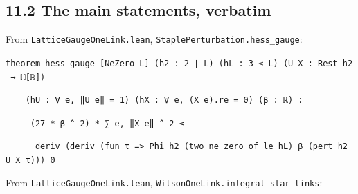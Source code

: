 \documentclass[11pt,a4paper]{article}
\theoremstyle{named}
\begin{document}
\subsection*{11.2 The main statements, verbatim}
From \texttt{LatticeGaugeOneLink.\allowbreak{}lean}, \texttt{StaplePerturbation.\allowbreak{}hess\_\allowbreak{}gauge}:

\begin{leancode}
\item \texttt{theorem\ \allowbreak{}hess\_\allowbreak{}gauge\ \allowbreak{}[NeZero\ \allowbreak{}L]\ \allowbreak{}(h2\ \allowbreak{}:\ \allowbreak{}2\ \allowbreak{}∣\ \allowbreak{}L)\ \allowbreak{}(hL\ \allowbreak{}:\ \allowbreak{}3\ \allowbreak{}≤\ \allowbreak{}L)\ \allowbreak{}(U\ \allowbreak{}X\ \allowbreak{}:\ \allowbreak{}Rest\ \allowbreak{}h2\ \allowbreak{}→\ \allowbreak{}ℍ[ℝ])}
\item \texttt{\ \allowbreak{}\ \allowbreak{}\ \allowbreak{}\ \allowbreak{}(hU\ \allowbreak{}:\ \allowbreak{}∀\ \allowbreak{}e,\ \allowbreak{}‖U\ \allowbreak{}e‖\ \allowbreak{}=\ \allowbreak{}1)\ \allowbreak{}(hX\ \allowbreak{}:\ \allowbreak{}∀\ \allowbreak{}e,\ \allowbreak{}(X\ \allowbreak{}e).\allowbreak{}re\ \allowbreak{}=\ \allowbreak{}0)\ \allowbreak{}(β\ \allowbreak{}:\ \allowbreak{}ℝ)\ \allowbreak{}:}
\item \texttt{\ \allowbreak{}\ \allowbreak{}\ \allowbreak{}\ \allowbreak{}-(27\ \allowbreak{}*\ \allowbreak{}β\ \allowbreak{}\textasciicircum{}\ \allowbreak{}2)\ \allowbreak{}*\ \allowbreak{}∑\ \allowbreak{}e,\ \allowbreak{}‖X\ \allowbreak{}e‖\ \allowbreak{}\textasciicircum{}\ \allowbreak{}2\ \allowbreak{}≤}
\item \texttt{\ \allowbreak{}\ \allowbreak{}\ \allowbreak{}\ \allowbreak{}\ \allowbreak{}\ \allowbreak{}deriv\ \allowbreak{}(deriv\ \allowbreak{}(fun\ \allowbreak{}τ\ \allowbreak{}=\textgreater{}\ \allowbreak{}Phi\ \allowbreak{}h2\ \allowbreak{}(two\_\allowbreak{}ne\_\allowbreak{}zero\_\allowbreak{}of\_\allowbreak{}le\ \allowbreak{}hL)\ \allowbreak{}β\ \allowbreak{}(pert\ \allowbreak{}h2\ \allowbreak{}U\ \allowbreak{}X\ \allowbreak{}τ)))\ \allowbreak{}0}
\end{leancode}
From \texttt{LatticeGaugeOneLink.\allowbreak{}lean}, \texttt{WilsonOneLink.\allowbreak{}integral\_\allowbreak{}star\_\allowbreak{}links}:
\end{document}
